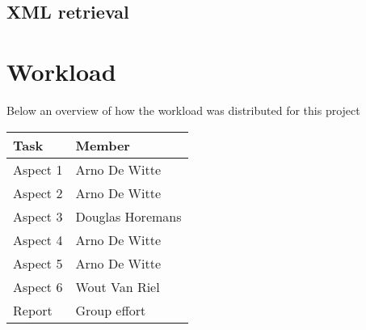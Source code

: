\documentclass{article}
\begin{document}
\subsection{XML retrieval}

\section{Workload}
Below an overview of how the workload was distributed for this project

\begin{center}
	\begin{tabular}{ | l | l |}
		\hline
		\textbf{Task} & \textbf{Member}  \\ \hline
		Aspect 1      & Arno De Witte    \\ \hline
		Aspect 2      & Arno De Witte    \\ \hline
		Aspect 3      & Douglas Horemans \\ \hline
		Aspect 4      & Arno De Witte    \\ \hline
		Aspect 5      & Arno De Witte    \\ \hline
		Aspect 6      & Wout Van Riel    \\ \hline
		Report        & Group effort     \\ \hline
	\end{tabular}
\end{center}
\end{document}

